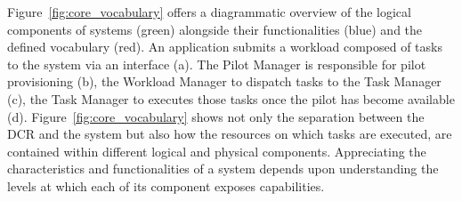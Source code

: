 \documentclass{sig-alternate}
\begin{document}


Figure~\ref{fig:core_vocabulary} offers a diagrammatic overview of the logical
components of \pilot systems (green) alongside their functionalities (blue) and
the defined vocabulary (red). An application submits a workload composed of
tasks to the \pilot system via an interface (a). The Pilot Manager is
responsible for pilot provisioning (b), the Workload Manager to dispatch tasks
to the Task Manager (c), the Task Manager to executes those tasks once the pilot
has become available (d). Figure~\ref{fig:core_vocabulary} shows not only the
separation between the DCR and the \pilot system but also how the resources on
which tasks are executed, are contained within different logical and physical
components. Appreciating the characteristics and functionalities of a
\pilot system depends upon understanding the levels at which each of its
component exposes capabilities.

\end{document}
